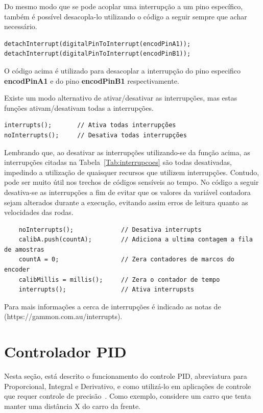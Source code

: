 \documentclass[a4paper,12pt,portuguese]{ufms-cpcx}
\begin{document}
Do mesmo modo que se pode acoplar uma interrupção a um pino específico, também é possível desacopla-lo utilizando o código a seguir sempre que achar necessário.

\begin{lstlisting}
detachInterrupt(digitalPinToInterrupt(encodPinA1));
detachInterrupt(digitalPinToInterrupt(encodPinB1));
\end{lstlisting}

O código acima é utilizado para desacoplar a interrupção do pino especifico \textbf{encodPinA1} e do pino \textbf{encodPinB1} respectivamente.

Existe um modo alternativo de ativar\//desativar as interrupções, mas estas funções ativam\//desativam todas a interrupções.

\begin{lstlisting}
interrupts();		// Ativa todas interrupções
noInterrupts();		// Desativa todas interrupções
\end{lstlisting}

Lembrando que, ao desativar as interrupções utilizando-se da função acima, as interrupções citadas na Tabela~\ref{Tab:interrupcoes} são todas desativadas, impedindo a utilização de quaisquer recursos que utilizem interrupções. Contudo, pode ser muito útil nos trechos de códigos sensíveis ao tempo. No código a seguir desativa-se as interrupções a fim de evitar que os valores da variável contadora sejam alterados durante a execução, evitando assim erros de leitura quanto as velocidades das rodas.
\begin{lstlisting}
	noInterrupts();				// Desativa interrupts
	calibA.push(countA);		// Adiciona a ultima contagem a fila de amostras
	countA = 0;					// Zera contadores de marcos do encoder
	calibMillis = millis();		// Zera o contador de tempo
	interrupts();				// Ativa interrupsts
\end{lstlisting}

Para mais informações a cerca de interrupções é indicado as notas de  (https://gammon.com.au/interrupts).

\section{Controlador PID}\label{pid}
Nesta seção, está descrito o funcionamento do controle PID, abreviatura para Proporcional, Integral e Derivativo, e como utilizá-lo em aplicações de controle que requer controle de precisão~\cite{controlepid}. Como exemplo, considere  um carro que tenta manter uma distância X do carro da frente.
\end{document}
